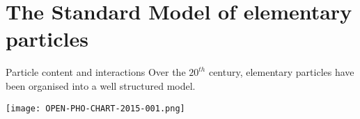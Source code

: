 \section{The Standard Model of elementary particles}
\begin{frame}{Particle content and interactions}
    Over the $20^{th}$ century, elementary particles have been organised into a well structured model.

  \begin{center} \texttt{[image: OPEN-PHO-CHART-2015-001.png]} \end{center}
\end{frame}

